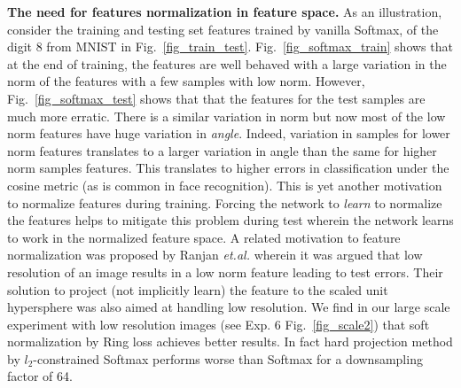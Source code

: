 \documentclass[10pt,twocolumn,letterpaper]{article}
\begin{document}
\textbf{ The need for features normalization in feature space.} As an illustration, consider the training and testing set features trained by vanilla Softmax, of the digit 8 from MNIST in Fig.~\ref{fig_train_test}. Fig.~\ref{fig_softmax_train} shows that at the end of training, the features are well behaved with a large variation in the norm of the features with a few samples with low norm. However, Fig.~\ref{fig_softmax_test} shows that that the features for the test samples are much more erratic. There is a similar variation in norm but now most of the low norm features have huge variation in \textit{angle}. Indeed, variation in samples for lower norm features translates to a larger variation in angle than the same for higher norm samples features. This translates to higher errors in classification under the cosine metric (as is common in face recognition). This is yet another motivation to normalize features during training. Forcing the network to \textit{learn} to normalize the features helps to mitigate this problem during test wherein the network learns to work in the normalized feature space. A related motivation to feature normalization was proposed by Ranjan \emph{et.al.} \cite{ranjan2017l2} wherein it was argued that low resolution of an image results in a low norm feature leading to test errors. Their solution to project (not implicitly learn) the feature to the scaled unit hypersphere was also aimed at handling low resolution. We find in our large scale experiment with low resolution images (see Exp. 6 Fig.~\ref{fig_scale2}) that soft normalization by Ring loss achieves better results. In fact hard projection method by $l_2$-constrained Softmax \cite{ranjan2017l2} performs worse than Softmax for a downsampling factor of 64.


\end{document}
